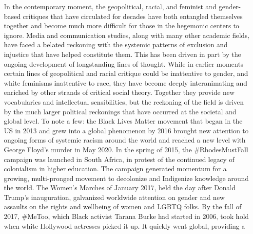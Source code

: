 \documentclass{tufte-handout}
\begin{document}
In the contemporary moment, the geopolitical, racial, and feminist and
gender-based critiques that have circulated for decades have both
entangled themselves together and become much more difficult for those
in the hegemonic centers to ignore. Media and communication studies,
along with many other academic fields, have faced a belated reckoning
with the systemic patterns of exclusion and injustice that have helped
constitute them. This has been driven in part by the ongoing development
of longstanding lines of thought. While in earlier moments certain lines
of geopolitical and racial critique could be inattentive to gender, and
white feminisms inattentive to race, they have become deeply
interanimating and enriched by other strands of critical social theory.
Together they provide new vocabularies and intellectual sensibilities,
but the reckoning of the field is driven by the much larger political
reckonings that have occurred at the societal and global level. To note
a few: the Black Lives Matter movement that began in the US in 2013 and
grew into a global phenomenon by 2016 brought new attention to ongoing
forms of systemic racism around the world and reached a new level with
George Floyd's murder in May 2020. In the spring of 2015, the
\#RhodesMustFall campaign was launched in South Africa, in protest of
the continued legacy of colonialism in higher education. The campaign
generated momentum for a growing, multi-pronged movement to decolonize
and Indigenize knowledge around the world. The Women's Marches of
January 2017, held the day after Donald Trump's inauguration, galvanized
worldwide attention on gender and new assaults on the rights and
wellbeing of women and LGBTQ folks. By the fall of 2017, \#MeToo, which
Black activist Tarana Burke had started in 2006, took hold when white
Hollywood actresses picked it up. It quickly went global, providing a
\end{document}
